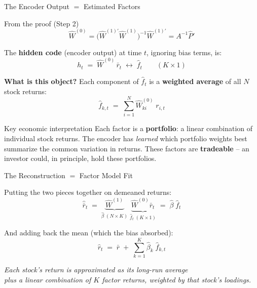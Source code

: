 \documentclass[aspectratio=169]{beamer}
\begin{document}
%
%
\begin{frame}{The Encoder Output \texorpdfstring{$=$}{=} Estimated Factors}
\small
\begin{block}{From the proof (Step 2)}
\vspace{-0.5em}
\[
\hat{W}^{(0)} = \bigl(\hat{W}^{(1)\prime}\hat{W}^{(1)}\bigr)^{-1}\hat{W}^{(1)\prime} = A^{-1}\hat{P}'
\]
\end{block}

\vspace{0.3em}

The \textbf{hidden code} (encoder output) at time $t$, ignoring bias terms, is:
\[
h_t \;=\; \hat{W}^{(0)}\, \bar{r}_t \;\longleftrightarrow\; \hat{f}_t \qquad (K \times 1)
\]

\vspace{0.3em}

\textbf{What is this object?} Each component of $\hat{f}_t$ is a \textbf{weighted average} of all $N$ stock returns:
\[
\hat{f}_{k,t} \;=\; \sum_{i=1}^{N} \hat{W}^{(0)}_{ki}\; r_{i,t}
\]

\begin{exampleblock}{Key economic interpretation}
Each factor is a \textbf{portfolio}: a linear combination of individual stock returns. The encoder has \textit{learned} which portfolio weights best summarize the common variation in returns. These factors are \textbf{tradeable} -- an investor could, in principle, hold these portfolios.
\end{exampleblock}

\end{frame}
%
%
\begin{frame}{The Reconstruction \texorpdfstring{$=$}{=} Factor Model Fit}

Putting the two pieces together on demeaned returns:
\[
\hat{\bar{r}}_t \;=\; \underbrace{\hat{W}^{(1)}}_{\hat{\beta}\;(N \times K)}\; \underbrace{\hat{W}^{(0)} \bar{r}_t}_{\hat{f}_t\;(K \times 1)} \;=\; \hat{\beta}\; \hat{f}_t
\]

\vspace{0.3em}

And adding back the mean (which the bias absorbed):
\[
\boxed{\hat{r}_t \;=\; \bar{r} \;+\; \sum_{k=1}^{K} \hat{\beta}_k\; \hat{f}_{k,t}}
\]

\vspace{0.3em}

\begin{center}
\textit{Each stock's return is approximated as its long-run average\\plus a linear combination of $K$ factor returns, weighted by that stock's loadings.}
\end{center}
\end{frame}
\end{document}
